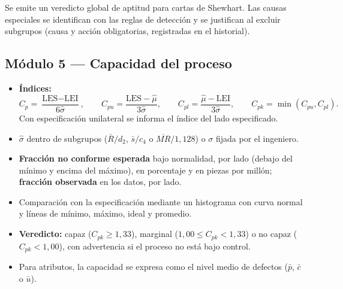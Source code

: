 \documentclass[11pt,a4paper]{article}
\begin{document}
Se emite un veredicto global de aptitud para cartas de Shewhart. Las causas especiales se
identifican con las reglas de detección y se justifican al excluir subgrupos (causa y acción
obligatorias, registradas en el historial).

\subsection{Módulo 5 — Capacidad del proceso}
\begin{itemize}
\item \textbf{Índices:}
  \[
  C_p=\frac{\text{LES}-\text{LEI}}{6\hat\sigma},\qquad
  C_{pu}=\frac{\text{LES}-\hat\mu}{3\hat\sigma},\qquad
  C_{pl}=\frac{\hat\mu-\text{LEI}}{3\hat\sigma},\qquad
  C_{pk}=\min(C_{pu},C_{pl}).
  \]
  Con especificación unilateral se informa el índice del lado especificado.
\item $\hat\sigma$ dentro de subgrupos ($\bar{R}/d_2$, $\bar{s}/c_4$ o $\overline{MR}/1{,}128$) o
  $\sigma$ fijada por el ingeniero.
\item \textbf{Fracción no conforme esperada} bajo normalidad, por lado (debajo del mínimo y
  encima del máximo), en porcentaje y en piezas por millón; \textbf{fracción observada} en los
  datos, por lado.
\item Comparación con la especificación mediante un histograma con curva normal y líneas de
  mínimo, máximo, ideal y promedio.
\item \textbf{Veredicto:} capaz ($C_{pk}\ge 1{,}33$), marginal ($1{,}00\le C_{pk}<1{,}33$) o no
  capaz ($C_{pk}<1{,}00$), con advertencia si el proceso no está bajo control.
\item Para atributos, la capacidad se expresa como el nivel medio de defectos ($\bar{p}$,
  $\bar{c}$ o $\bar{u}$).
\end{itemize}
\end{document}
